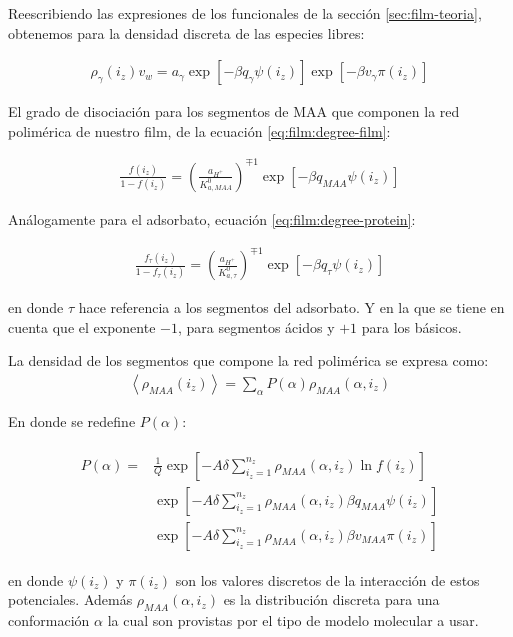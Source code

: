 Reescribiendo las expresiones de los funcionales de la secci\'on \ref{sec:film-teoria}, obtenemos para la densidad discreta de las especies libres:

\begin{align}
	\rho_\gamma(i_z)v_w = a_\gamma \exp\left[-\beta q_\gamma\psi(i_z)\right] \exp\left[-\beta v_\gamma\pi(i_z)\right]
\end{align}


El grado de disociaci\'on para los segmentos de MAA que componen la red polim\'erica de nuestro film, de la ecuaci\'on \ref{eq:film:degree-film}:

\begin{align}
	\frac{f(i_z)}{1-f(i_z)} = \left(\frac{a_{H^+}}{K^0_{a,MAA}}\right)^{\mp 1} \exp[-\beta q_{MAA} \psi(i_z)]
\end{align}

An\'alogamente para el adsorbato, ecuaci\'on \ref{eq:film:degree-protein}:

\begin{align}
	\frac{f_\tau(i_z)}{1-f_\tau(i_z)} = \left(\frac{a_{H^+}}{K^0_{a,\tau}}\right)^{\mp 1} \exp[-\beta q_\tau \psi(i_z)]
\end{align}

\noindent en donde $\tau$ hace referencia a los segmentos del adsorbato. Y en la que se tiene en cuenta que el exponente $-1$, para segmentos \'acidos y  $+1$ para los b\'asicos.

La densidad de los segmentos que compone la red polim\'erica se expresa como:
\begin{align}
	\left< \rho_{MAA}(i_z)\right> = \sum_\alpha P(\alpha)\rho_{MAA}(\alpha, i_z)
\end{align}

En donde se redefine $P(\alpha)$:


\begin{align}
	\begin{aligned}
		P(\alpha) = &\frac{1}{Q}\exp\left[ -A \delta \sum^{n_z}_{i_z = 1} \rho_{MAA}(\alpha, i_z) \ln f(i_z)\right] \\
		&\exp\left[ -A\delta \sum^{n_z}_{i_z = 1}  \rho_{MAA}(\alpha, i_z) \beta q_{MAA} \psi(i_z)\right] \\
		& \exp\left[ -A\delta \sum^{n_z}_{i_z = 1}  \rho_{MAA}(\alpha, i_z) \beta v_{MAA} \pi(i_z)\right] 
	\end{aligned}
\end{align}

\noindent en donde $\psi(i_z)$ y $\pi(i_z)$ son los valores discretos de la interacci\'on de estos potenciales. Adem\'as $\rho_{MAA}(\alpha, i_z)$ es la distribuci\'on discreta para una conformaci\'on $\alpha$ la cual son provistas por el tipo de modelo molecular a usar.

